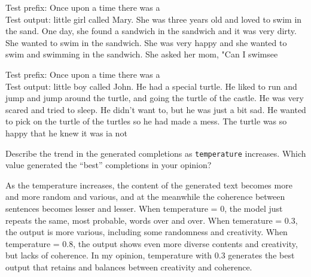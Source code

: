\documentclass[11pt,addpoints,answers]{exam}
\begin{document}
\begin{questions}
\begin{parts}
\begin{subparts}
    \begin{your_solution}[title=\texttt{Temperature = 0.3}, height=3cm]
        \small
		Test prefix: Once upon a time there was a \\
		Test output: little girl called Mary. She was three years old and loved to swim in the sand. One day, she found a sandwich in the sandwich and it was very dirty. She wanted to swim in the sandwich. She was very happy and she wanted to swim and swimming in the sandwich. She asked her mom, "Can I swimsee        
    \end{your_solution}
    
    \begin{your_solution}[title=\texttt{Temperature = 0.8}, height=3cm]
        \small
		Test prefix: Once upon a time there was a \\
		Test output: little boy called John. He had a special turtle. He liked to run and jump and jump around the turtle, and going the turtle of the castle. He was very scared and tried to sleep. He didn't want to, but he was just a bit sad. He wanted to pick on the turtle of the turtles so he had made a mess. The turtle was so happy that he knew it was ia not
    \end{your_solution}


    \clearpage
    \subpart[1]Describe the trend in the generated completions as \texttt{temperature} increases. Which value generated the ``best'' completions in your opinion?

    \begin{your_solution}[height=4cm]
        \small
        As the temperature increases, the content of the generated text becomes more and more random and various, and at the meanwhile the coherence between sentences becomes lesser and lesser. When temperature = 0, the model just repeats the same, most probable, words over and over. When temerature = 0.3, the output is more various, including some randomness and creativity. When temperature = 0.8, the output shows even more diverse contents and creativity, but lacks of coherence. In my opinion, temperature with 0.3 generates the best output that retains and balances between creativity and coherence.
    \end{your_solution}
\end{subparts}

\end{parts}
    \newpage
    \end{questions}
\newpage
\end{document}
